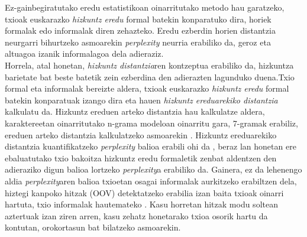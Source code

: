 \documentclass[information,article,submit,moreauthors,pdftex,10pt,a4paper]{Definitions/mdpi}
\begin{document}
\indent Ez-gainbegiratutako eredu estatistikoan oinarritutako metodo hau garatzeko, txioak euskarazko \textit{hizkuntz eredu} formal batekin konparatuko dira, horiek formalak edo informalak diren zehazteko. Eredu ezberdin horien distantzia neurgarri bihurtzeko asmoarekin \textit{perplexity} neurria erabiliko da, geroz eta altuagoa izanik informalagoa dela adieraziz.\\
\indent Horrela, atal honetan, \textit{hizkuntz distantzia}ren kontzeptua erabiliko da, hizkuntza barietate bat beste batetik zein ezberdina den adierazten lagunduko duena.Txio formal eta informalak bereizte aldera, txioak euskarazko \textit{hizkuntz eredu} formal batekin konparatuak izango dira eta hauen \textit{hizkuntz ereduarekiko distantzia} kalkulatu da. Hizkuntz ereduen arteko distantzia hau kalkulatze aldera, karaktereetan oinarritutako n-grama modeloan oinarritu gara, 7-gramak erabiliz, ereduen arteko distantzia kalkulatzeko asmoarekin \citep{gamallo2017language}. Hizkuntz ereduarekiko distantzia kuantifikatzeko \textit{perplexity} balioa erabili ohi da \citep{chen1999empirical}, beraz lan honetan ere ebaluatutako txio bakoitza hizkuntz eredu formaletik zenbat aldentzen den adieraziko digun balioa lortzeko \textit{perplexity}a erabiliko da. Gainera, ez da lehenengo aldia \textit{perplexity}aren balioa txioetan osagai informalak aurkitzeko erabiltzen dela, hiztegi kanpoko hitzak (OOV) detektatzeko erabilia izan baita txioak oinarri hartuta, txio informalak hautemateko \citep{gonzalez2015analysis}. Kasu horretan hitzak modu soltean aztertuak izan ziren arren, kasu zehatz honetarako txioa osorik hartu da kontutan, orokortasun bat bilatzeko asmoarekin.\\

\end{document}
